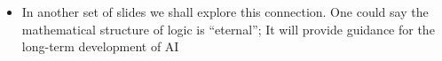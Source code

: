 \begin{itemize}

	
	
	
	\item {}
	{In another set of slides we shall explore this connection.  One could say the mathematical structure of logic is ``eternal'';  It will provide guidance for the long-term development of AI}
	
\end{itemize}


